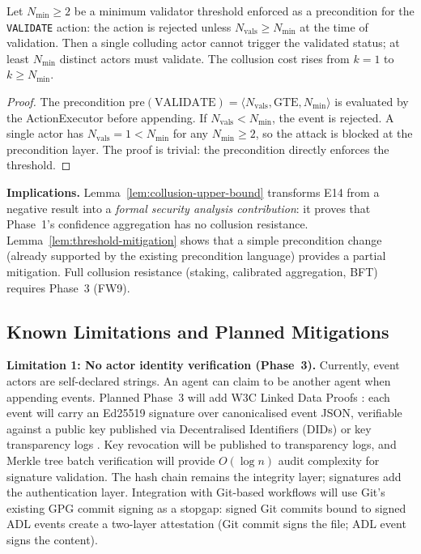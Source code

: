 \begin{lemma}\label{lem:threshold-mitigation}
Let $N_{\min} \geq 2$ be a minimum validator threshold enforced as a precondition for the \texttt{VALIDATE} action: the action is rejected unless $N_{\text{vals}} \geq N_{\min}$ at the time of validation. Then a single colluding actor cannot trigger the $\text{validated}$ status; at least $N_{\min}$ distinct actors must validate. The collusion cost rises from $k = 1$ to $k \geq N_{\min}$.
\end{lemma}

\begin{proof}
The precondition $\text{pre}(\text{VALIDATE}) = \langle N_{\text{vals}}, \text{GTE}, N_{\min} \rangle$ is evaluated by the ActionExecutor before appending. If $N_{\text{vals}} < N_{\min}$, the event is rejected. A single actor has $N_{\text{vals}} = 1 < N_{\min}$ for any $N_{\min} \geq 2$, so the attack is blocked at the precondition layer. The proof is trivial: the precondition directly enforces the threshold.
\end{proof}

\textbf{Implications.} Lemma~\ref{lem:collusion-upper-bound} transforms E14 from a negative result into a \emph{formal security analysis contribution}: it proves that Phase~1's confidence aggregation has no collusion resistance. Lemma~\ref{lem:threshold-mitigation} shows that a simple precondition change (already supported by the existing precondition language) provides a partial mitigation. Full collusion resistance (staking, calibrated aggregation, BFT) requires Phase~3 (FW9).

\subsection{Known Limitations and Planned Mitigations}

\textbf{Limitation 1: No actor identity verification (Phase~3).} Currently, event actors are self-declared strings. An agent can claim to be another agent when appending events. Planned Phase~3 will add W3C Linked Data Proofs \cite{linked_data_proofs}: each event will carry an Ed25519 signature over canonicalised event JSON, verifiable against a public key published via Decentralised Identifiers (DIDs) \cite{dids} or key transparency logs \cite{key_transparency}. Key revocation will be published to transparency logs, and Merkle tree batch verification will provide $O(\log n)$ audit complexity for signature validation. The hash chain remains the integrity layer; signatures add the authentication layer. Integration with Git-based workflows will use Git's existing GPG commit signing as a stopgap: signed Git commits bound to signed ADL events create a two-layer attestation (Git commit signs the file; ADL event signs the content).


